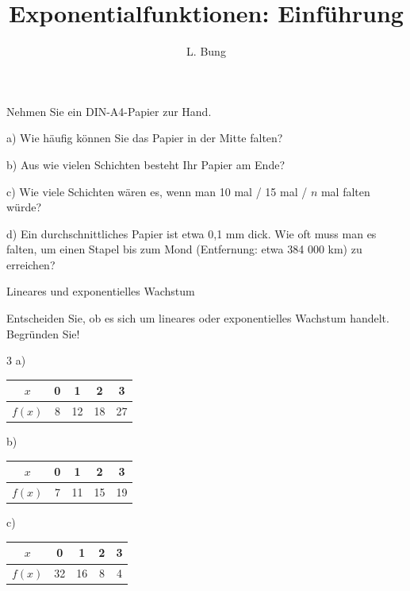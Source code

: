 \documentclass[11pt, a4paper, oneside]{article}
\begin{document}
	\author{L. Bung}
	\title{Exponentialfunktionen: \hspace{10cm} Einführung}
	\subject{Mathematik}
	\maketitle
	
	
	Nehmen Sie ein DIN-A4-Papier zur Hand.
	
	a) Wie häufig können Sie das Papier in der Mitte falten?
	
	\checkered[1.5cm]
	
	b) Aus wie vielen Schichten besteht Ihr Papier am Ende?
	
	\checkered[3cm]
	
	c) Wie viele Schichten wären es, wenn man 10 mal / 15 mal / $n$ mal falten würde?
	
	\checkered[3cm]
	
	d) Ein durchschnittliches Papier ist etwa 0,1 mm dick.
	Wie oft muss man es falten, um einen Stapel bis zum Mond (Entfernung: etwa 384 000 km) zu erreichen?
	
	\checkered[3cm]
	
	\begin{hint}{Lineares und exponentielles Wachstum}
		\phantom{x}\vspace{6cm}
	\end{hint}
	
	
	Entscheiden Sie, ob es sich um lineares oder exponentielles Wachstum handelt.
	Begründen Sie!
	
	\begin{multicols}{3}
		a)
		\begin{tabular}{|c||c|c|c|c|}
			\hline
			$x$ & 0 & 1 & 2 & 3\\
			\hline
			$f(x)$ & 8 & 12 & 18 & 27\\
			\hline
		\end{tabular}
		
		b)
		\begin{tabular}{|c||c|c|c|c|}
			\hline
			$x$ & 0 & 1 & 2 & 3\\
			\hline
			$f(x)$ & 7 & 11 & 15 & 19\\
			\hline
		\end{tabular}
		
		c)
		\begin{tabular}{|c||c|c|c|c|}
			\hline
			$x$ & 0 & 1 & 2 & 3\\
			\hline
			$f(x)$ & 32 & 16 & 8 & 4\\
			\hline
		\end{tabular}
	\end{multicols}
	
\end{document}
